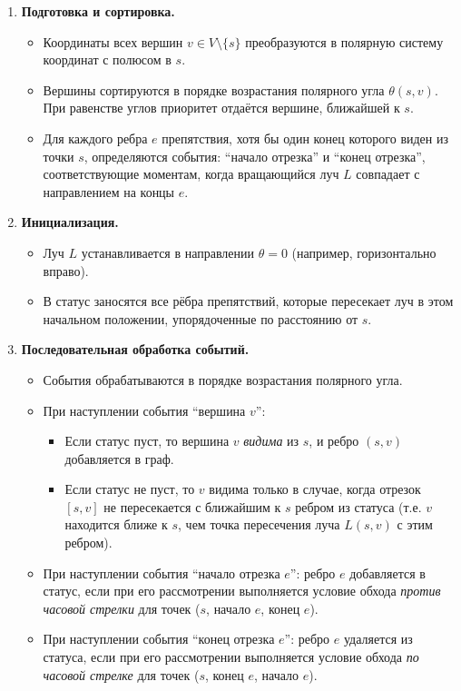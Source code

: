 \documentclass{article}
\theoremstyle{definition}
\begin{document}
\begin{enumerate}[label=\textbf{Этап \arabic*.}]
    \item \textbf{Подготовка и сортировка.}
    \begin{itemize}
        \item Координаты всех вершин $v \in V \setminus \{s\}$ преобразуются в полярную систему координат с полюсом в $s$.
        \item Вершины сортируются в порядке возрастания полярного угла $\theta(s, v)$. При равенстве углов приоритет отдаётся вершине, ближайшей к $s$.
        \item Для каждого ребра $e$ препятствия, хотя бы один конец которого виден из точки $s$, определяются события: 
            ``начало отрезка'' и ``конец отрезка'', соответствующие моментам, когда вращающийся луч $L$ совпадает с направлением на концы $e$.
    \end{itemize}

    \item \textbf{Инициализация.}
    \begin{itemize}
        \item Луч $L$ устанавливается в направлении $\theta = 0$ (например, горизонтально вправо).
        \item В статус заносятся все рёбра препятствий, которые пересекает луч в этом начальном положении, упорядоченные по расстоянию от $s$.
    \end{itemize}

    \item \textbf{Последовательная обработка событий.}
    \begin{itemize}
        \item События обрабатываются в порядке возрастания полярного угла.
        \item При наступлении события ``вершина $v$'':
        \begin{itemize}
            \item Если статус пуст, то вершина $v$ \emph{видима} из $s$, и ребро $(s, v)$ добавляется в граф.
            \item Если статус не пуст, то $v$ видима только в случае, когда отрезок $[s, v]$ не пересекается с ближайшим к $s$ ребром из статуса
                (т.е. $v$ находится ближе к $s$, чем точка пересечения луча $L(s, v)$ с этим ребром).
        \end{itemize}
        \item При наступлении события ``начало отрезка $e$'': ребро $e$ добавляется в статус,
            если при его рассмотрении выполняется условие обхода \emph{против часовой стрелки} для точек ($s$, начало $e$, конец $e$).
        \item При наступлении события ``конец отрезка $e$'': ребро $e$ удаляется из статуса,
            если при его рассмотрении выполняется условие обхода \emph{по часовой стрелке} для точек ($s$, конец $e$, начало $e$).
    \end{itemize}
\end{enumerate}
\end{document}
